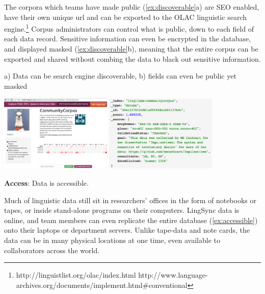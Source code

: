 \documentclass[letterpaper, 12pt, dvips]{mitwpl}
\begin{document}
\begin{description}
\begin{exe}
\label{ex:searchable}
\end{exe}

The corpora which teams have made public  (\ref{ex:discoverable}a) are SEO enabled, have their own unique url and can be exported to the OLAC linguistic search engine.\footnote{ http://linguistlist.org/olac/index.html 
\hspace{.2cm}http://www.language-archives.org/documents/implement.html\#conventional} Corpus administrators can control what is public, down to each field of each data record. Sensitive information can even be encrypted in the database, and displayed masked (\ref{ex:discoverable}b), meaning that the entire corpus can be exported and shared without combing the data to black out sensitive information. 

\begin{exe} 
\ex a) Data can be search engine discoverable, b) fields can even be public yet masked 

\hspace{-1.5in}
 \centering
   \includegraphics[width=0.4\textwidth]{discoverable}
   \includegraphics[width=0.4\textwidth]{confidential}

\label{ex:discoverable}
\end{exe}


\item {\bf Access}: Data is accessible. 
 
Much of linguistic data still sit in researchers' offices in the form of notebooks or tapes, or inside stand-alone programs on their computers.  LingSync data is online, and team members can even replicate the entire database (\ref{ex:accessible}) onto their laptops or department servers. Unlike tape-data and note cards, the data can be in many physical locations at one time, even available to collaborators across the world. 




\end{description}
\end{document}

